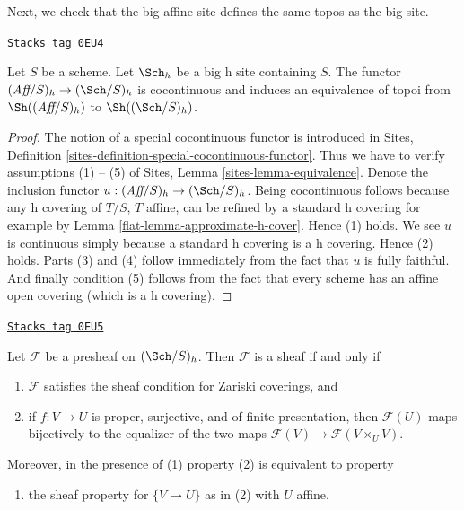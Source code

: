 Next, we check that the big affine site defines the same
topos as the big site.

\begin{lemma}
\label{flat-lemma-affine-big-site-h}
\href{https://stacks.math.columbia.edu/tag/0EU4}{\texttt{Stacks tag 0EU4}}

Let $S$ be a scheme. Let $\Sch_h$ be a big h
site containing $S$.
The functor $(\textit{Aff}/S)_h \to (\Sch/S)_h$
is cocontinuous and induces an equivalence of topoi from
$\Sh((\textit{Aff}/S)_h)$ to
$\Sh((\Sch/S)_h)$.
\end{lemma}

\begin{proof}

The notion of a special cocontinuous functor is introduced in
Sites, Definition \ref{sites-definition-special-cocontinuous-functor}.
Thus we have to verify assumptions (1) -- (5) of
Sites, Lemma \ref{sites-lemma-equivalence}.
Denote the inclusion functor
$u : (\textit{Aff}/S)_h \to (\Sch/S)_h$.
Being cocontinuous follows because any h covering of
$T/S$, $T$ affine, can be refined by a standard h covering
for example by Lemma \ref{flat-lemma-approximate-h-cover}. Hence (1) holds.
We see $u$ is continuous simply because a standard h covering
is a h covering.
Hence (2) holds. Parts (3) and (4) follow immediately from the fact
that $u$ is fully faithful. And finally condition (5) follows from the
fact that every scheme has an affine open covering (which is
a h covering).
\end{proof}

\begin{lemma}
\label{flat-lemma-characterize-sheaf-h}
\href{https://stacks.math.columbia.edu/tag/0EU5}{\texttt{Stacks tag 0EU5}}

Let $\mathcal{F}$ be a presheaf on $(\Sch/S)_h$.
Then $\mathcal{F}$ is a sheaf if and only if
\begin{enumerate}
\item $\mathcal{F}$ satisfies the sheaf condition for
Zariski coverings, and
\item if $f : V \to U$ is proper, surjective, and of finite presentation, then
$\mathcal{F}(U)$ maps bijectively to the equalizer
of the two maps $\mathcal{F}(V) \to \mathcal{F}(V \times_U V)$.
\end{enumerate}
Moreover, in the presence of (1) property (2) is equivalent to
property
\begin{enumerate}
\item[(2')] the sheaf property for $\{V \to U\}$ as in (2) with $U$ affine.
\end{enumerate}
\end{lemma}

